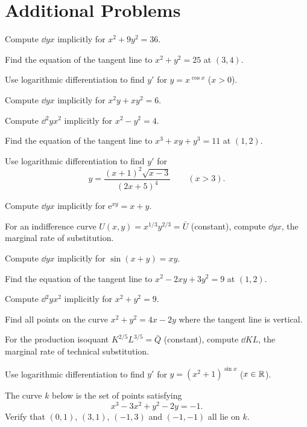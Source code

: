 \section{Additional Problems}

\begin{problems}
  \item Compute $\dd{y}{x}$ implicitly for $x^{2}+9y^{2}=36$.
  \item Find the equation of the tangent line to $x^{2}+y^{2}=25$ at
        $(3,4)$.
  \item Use logarithmic differentiation to find $y'$ for $y=x^{\cos x}$
        ($x>0$).
  \item Compute $\dd{y}{x}$ implicitly for $x^{2}y+xy^{2}=6$.
  \item Compute $\dd{^{2}y}{x^{2}}$ implicitly for $x^{2}-y^{2}=4$.
  \item Find the equation of the tangent line to $x^{3}+xy+y^{3}=11$ at
        $(1,2)$.
  \item Use logarithmic differentiation to find $y'$ for
        \[
          y=\frac{(x+1)^{2}\sqrt{x-3}}{(2x+5)^{4}}\qquad (x>3).
        \]
  \item Compute $\dd{y}{x}$ implicitly for $\mathrm{e}^{xy}=x+y$.
  \item For an indifference curve $U(x,y)=x^{1/3}y^{2/3}=\bar U$
        (constant), compute $\dd{y}{x}$, the marginal rate of
        substitution.
  \item Compute $\dd{y}{x}$ implicitly for $\sin(x+y)=xy$.
  \item Find the equation of the tangent line to $x^{2}-2xy+3y^{2}=9$ at
        $(1,2)$.
  \item Compute $\dd{^{2}y}{x^{2}}$ implicitly for $x^{2}+y^{2}=9$.
  \item Find all points on the curve $x^{2}+y^{2}=4x-2y$ where the tangent
        line is vertical.
  \item For the production isoquant $K^{2/5}L^{3/5}=\bar Q$ (constant),
        compute $\dd{K}{L}$, the marginal rate of technical
        substitution.
  \item Use logarithmic differentiation to find $y'$ for
        $y=(x^{2}+1)^{\sin x}$ ($x\in\mathbb{R}$).

  \item The curve $k$ below is the set of points satisfying
        \[
          x^{3}-3x^{2}+y^{2}-2y=-1 .
        \]
        Verify that $(0,1)$, $(3,1)$, $(-1,3)$ and $(-1,-1)$ all lie on
        $k$.


\end{problems}
